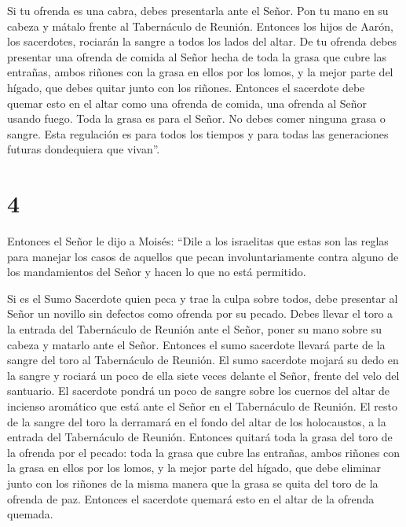  Si tu ofrenda es una cabra, debes presentarla ante el
Señor.  Pon tu mano en su cabeza y mátalo frente al
Tabernáculo de Reunión. Entonces los hijos de Aarón, los sacerdotes,
rociarán la sangre a todos los lados del altar.  De tu
ofrenda debes presentar una ofrenda de comida al Señor hecha de toda la
grasa que cubre las entrañas,  ambos riñones con la grasa
en ellos por los lomos, y la mejor parte del hígado, que debes quitar
junto con los riñones.  Entonces el sacerdote debe quemar
esto en el altar como una ofrenda de comida, una ofrenda al Señor usando
fuego. Toda la grasa es para el Señor.  No debes comer
ninguna grasa o sangre. Esta regulación es para todos los tiempos y para
todas las generaciones futuras dondequiera que vivan''.

\hypertarget{section-3}{%
\section{4}\label{section-3}}

 Entonces el Señor le dijo a Moisés:  ``Dile a
los israelitas que estas son las reglas para manejar los casos de
aquellos que pecan involuntariamente contra alguno de los mandamientos
del Señor y hacen lo que no está permitido.

 Si es el Sumo Sacerdote quien peca y trae la culpa sobre
todos, debe presentar al Señor un novillo sin defectos como ofrenda por
su pecado.  Debes llevar el toro a la entrada del
Tabernáculo de Reunión ante el Señor, poner su mano sobre su cabeza y
matarlo ante el Señor.  Entonces el sumo sacerdote llevará
parte de la sangre del toro al Tabernáculo de Reunión.  El
sumo sacerdote mojará su dedo en la sangre y rociará un poco de ella
siete veces delante el Señor, frente del velo del santuario.
 El sacerdote pondrá un poco de sangre sobre los cuernos del
altar de incienso aromático que está ante el Señor en el Tabernáculo de
Reunión. El resto de la sangre del toro la derramará en el fondo del
altar de los holocaustos, a la entrada del Tabernáculo de Reunión.
 Entonces quitará toda la grasa del toro de la ofrenda por
el pecado: toda la grasa que cubre las entrañas,  ambos
riñones con la grasa en ellos por los lomos, y la mejor parte del
hígado, que debe eliminar junto con los riñones  de la
misma manera que la grasa se quita del toro de la ofrenda de paz.
Entonces el sacerdote quemará esto en el altar de la ofrenda quemada.

